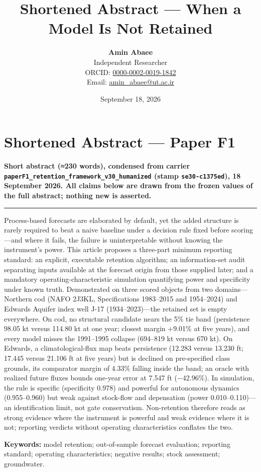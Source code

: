 \documentclass[11pt]{article}
\title{Shortened Abstract — When a Model Is Not Retained}
\author{\textbf{Amin Abaee}\\ Independent Researcher\\[2pt] ORCID: \href{https://orcid.org/0000-0002-0019-1842}{0000-0002-0019-1842}\\ Email: \href{mailto:amin_abaee@ut.ac.ir}{amin_abaee@ut.ac.ir}}
\date{September 18, 2026}
\begin{document}
\maketitle

\section{Shortened Abstract --- Paper
F1}\label{shortened-abstract-paper-f1}

\textbf{Short abstract (≈230 words), condensed from carrier
\texttt{paperF1\_retention\_framework\_v30\_humanized} (stamp
\texttt{se30-c1375ed}), 18 September 2026. All claims below are drawn
from the frozen values of the full abstract; nothing new is asserted.}

\begin{center}\rule{0.5\linewidth}{0.5pt}\end{center}

Process-based forecasts are elaborated by default, yet the added
structure is rarely required to beat a naive baseline under a decision
rule fixed before scoring---and where it fails, the failure is
uninterpretable without knowing the instrument's power. This article
proposes a three-part minimum reporting standard: an explicit,
executable retention algorithm; an information-set audit separating
inputs available at the forecast origin from those supplied later; and a
mandatory operating-characteristic simulation quantifying power and
specificity under known truth. Demonstrated on three scored objects from
two domains---Northern cod (NAFO 2J3KL, Specifications 1983--2015 and
1954--2024) and Edwards Aquifer index well J-17 (1934--2023)---the
retained set is empty everywhere. On cod, no structural candidate nears
the 5\% tie band (persistence 98.05 kt versus 114.80 kt at one year;
closest margin +9.01\% at five years), and every model misses the
1991--1995 collapse (694--819 kt versus 670 kt). On Edwards, a
climatological-flux map beats persistence (12.283 versus 13.230 ft;
17.445 versus 21.106 ft at five years) but is declined on pre-specified
class grounds, its comparator margin of 4.33\% falling inside the band;
an oracle with realized future fluxes bounds one-year error at 7.547 ft
(−42.96\%). In simulation, the rule is specific (specificity 0.978) and
powerful for autonomous dynamics (0.955--0.960) but weak against
stock-flow and depensation (power 0.010--0.110)---an identification
limit, not gate conservatism. Non-retention therefore reads as strong
evidence where the instrument is powerful and weak evidence where it is
not; reporting verdicts without operating characteristics conflates the
two.

\textbf{Keywords:} model retention; out-of-sample forecast evaluation;
reporting standard; operating characteristics; negative results; stock
assessment; groundwater.
\end{document}
